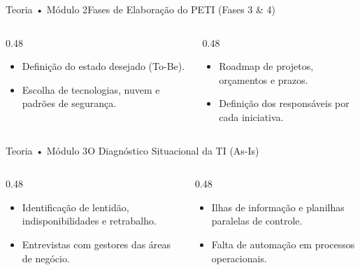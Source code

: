 \begin{senaiframe}{Teoria • Módulo 2}{Fases de Elaboração do PETI (Fases 3 \& 4)}
  \begin{columns}[t]
    \begin{column}{0.48\textwidth}
      \begin{tcolorbox}[senaiambercard, title={Fase 3: Arquitetura Futura}]
        \begin{itemize}
          \item Definição do estado desejado (To-Be).
          \item Escolha de tecnologias, nuvem e padrões de segurança.
        \end{itemize}
      \end{tcolorbox}
    \end{column}
    \begin{column}{0.48\textwidth}
      \begin{tcolorbox}[senaigreencard, title={Fase 4: Plano de Transição}]
        \begin{itemize}
          \item Roadmap de projetos, orçamentos e prazos.
          \item Definição dos responsáveis por cada iniciativa.
        \end{itemize}
      \end{tcolorbox}
    \end{column}
  \end{columns}
\end{senaiframe}

\begin{senaiframe}{Teoria • Módulo 3}{O Diagnóstico Situacional da TI (As-Is)}
  \begin{columns}[t]
    \begin{column}{0.48\textwidth}
      \begin{tcolorbox}[senaicard, title={Levantamento de Dores}]
        \begin{itemize}
          \item Identificação de lentidão, indisponibilidades e retrabalho.
          \item Entrevistas com gestores das áreas de negócio.
        \end{itemize}
      \end{tcolorbox}
    \end{column}
    \begin{column}{0.48\textwidth}
      \begin{tcolorbox}[senairedcard, title={Gargalos de Integração}]
        \begin{itemize}
          \item Ilhas de informação e planilhas paralelas de controle.
          \item Falta de automação em processos operacionais.
        \end{itemize}
      \end{tcolorbox}
    \end{column}
  \end{columns}
\end{senaiframe}

